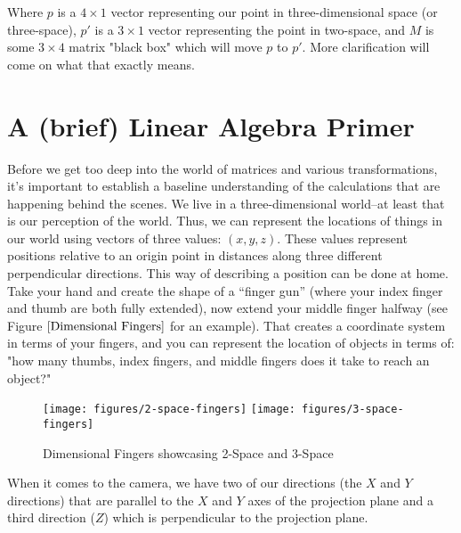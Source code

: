 \documentclass[
    12pt,
    twoside,
    bibstyle=chicago,
    headerstyle=uppercase,
	bibfile=biblatex_updating.bib
]{reedthesis}
\begin{document}
Where $p$ is a $4\times1$ vector representing our point in three-dimensional space (or three-space), $p'$ is a $3\times1$ vector representing the point in two-space, and $M$ is some $3\times4$ matrix "black box" which will move $p$ to $p'$. More clarification will come on what that exactly means.

\section{A (brief) Linear Algebra Primer}
Before we get too deep into the world of matrices and various transformations, it's important to establish a baseline understanding of the calculations that are happening behind the scenes. We live in a three-dimensional world--at least that is our perception of the world. Thus, we can represent the locations of things in our world using vectors of three values: $(x, y, z)$. These values represent positions relative to an origin point in distances along three different perpendicular directions. This way of describing a position can be done at home. Take your hand and create the shape of a “finger gun” (where your index finger and thumb are both fully extended), now extend your middle finger halfway (see Figure $\ref{Dimensional Fingers}$ for an example). That creates a coordinate system in terms of your fingers, and you can represent the location of objects in terms of: "how many thumbs, index fingers, and middle fingers does it take to reach an object?" 

\begin{figure}[t]
	   
	       \centering
	    
	    \texttt{[image: figures/2-space-fingers]} 
		\hfill	    
	    \texttt{[image: figures/3-space-fingers]}
	     \caption{Dimensional Fingers showcasing 2-Space and 3-Space}
	 \label{Dimensional Fingers}
	\end{figure}

When it comes to the camera, we have two of our directions (the $X$ and $Y$ directions) that are parallel to the $X$ and $Y$ axes of the projection plane and a third direction ($Z$) which is perpendicular to the projection plane. 
\end{document}
